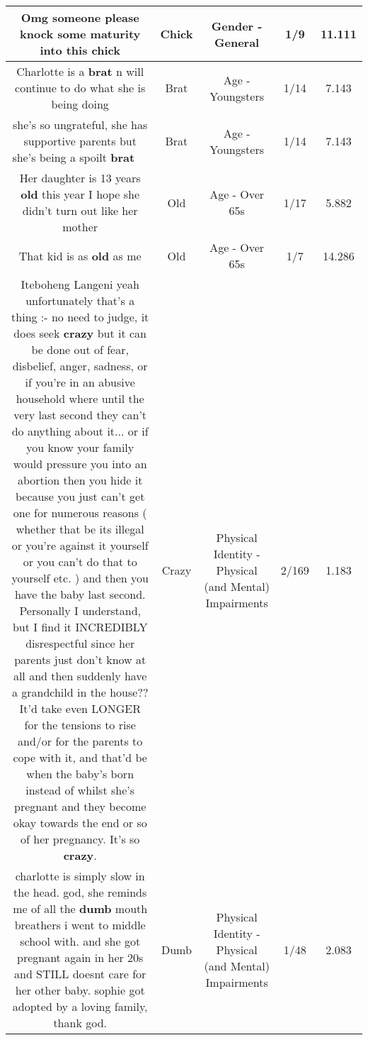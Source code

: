 \documentclass[11pt]{article}
\newlength\mylength
\begin{document}
\begin{center}
\begin{longtable}{|C{.65\mylength}|C{.30\mylength}|C{.12\mylength}|C{.12\mylength}|C{.12\mylength}|}
  \small Omg someone please knock some maturity into this chick\normalsize   & Chick & Gender - General & 1/9 & 11.111 \\  \hline
  \small Charlotte is a \textbf{brat} n will continue to do what she is being doing\normalsize   & Brat & Age - Youngsters & 1/14 & 7.143 \\  \hline
  \small she's so ungrateful, she has supportive parents but she's being a spoilt \textbf{brat} 🤦🏻‍♀️\normalsize   & Brat & Age - Youngsters & 1/14 & 7.143 \\  \hline
  \small Her daughter is 13 years \textbf{old} this year I hope she didn't turn out like her mother\normalsize   & Old & Age - Over 65s & 1/17 & 5.882 \\  \hline
  \small That kid is as \textbf{old} as me\normalsize   & Old & Age - Over 65s & 1/7 & 14.286 \\  \hline
  \small Iteboheng Langeni yeah unfortunately that's a thing :- no need to judge, it does seek \textbf{crazy} but it can be done out of fear, disbelief, anger, sadness, or if you're in an abusive household where until the very last second they can't do anything about it... or if you know your family would pressure you into an abortion then you hide it because you just can't get one for numerous reasons ( whether that be its illegal or you're against it yourself or you can't do that to yourself etc. ) and then you have the baby last second. Personally I understand, but I find it INCREDIBLY disrespectful since her parents just don't know at all and then suddenly have a grandchild in the house?? It'd take even LONGER for the tensions to rise and/or for the parents to cope with it, and that'd be when the baby's born instead of whilst she's pregnant and they become okay towards the end or so of her pregnancy. It's so \textbf{crazy}.\normalsize   & Crazy & Physical Identity - Physical (and Mental) Impairments & 2/169 & 1.183 \\  \hline
  \small charlotte is simply slow in the head. god, she reminds me of all the \textbf{dumb} mouth breathers i went to middle school with. and she got pregnant again in her 20s and STILL doesnt care for her other baby. sophie got adopted by a loving family, thank god.\normalsize   & Dumb & Physical Identity - Physical (and Mental) Impairments & 1/48 & 2.083 \\  \hline

\end{longtable}
\end{center}
\end{document}
